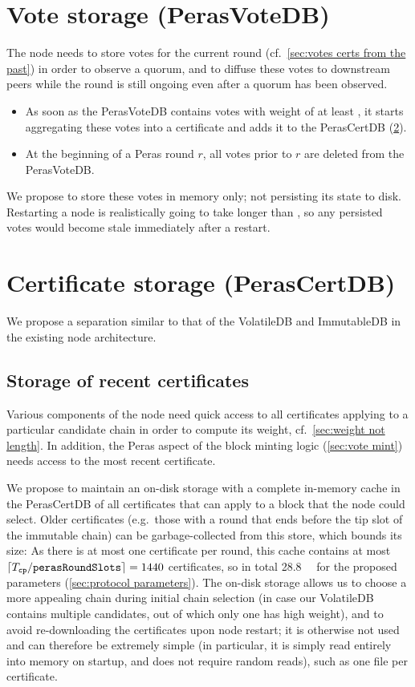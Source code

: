 \section{Vote storage (PerasVoteDB)}\label{sec:vote db}

The node needs to store votes for the current round (cf.~\cref{sec:votes certs from the past}) in order to observe a quorum, and to diffuse these votes to downstream peers while the round is still ongoing even after a quorum has been observed.

\begin{itemize}
\item
  As soon as the PerasVoteDB contains votes with weight of at least \perasQuorum, it starts aggregating these votes into a certificate and adds it to the PerasCertDB (\cref{sec:cert db}).
\item
  At the beginning of a Peras round $r$, all votes prior to $r$ are deleted from the PerasVoteDB\@.
\end{itemize}

We propose to store these votes in memory only; not persisting its state to disk.
Restarting a node is realistically going to take longer than \perasRoundSlots{}, so any persisted votes would become stale immediately after a restart.

\section{Certificate storage (PerasCertDB)}\label{sec:cert db}

We propose a separation similar to that of the VolatileDB and ImmutableDB in the existing node architecture.

\subsection{Storage of recent certificates}
Various components of the node need quick access to all certificates applying to a particular candidate chain in order to compute its weight, cf.~\cref{sec:weight not length}.
In addition, the Peras aspect of the block minting logic (\cref{sec:vote mint}) needs access to the most recent certificate.

We propose to maintain an on-disk storage with a complete in-memory cache in the PerasCertDB of all certificates that can apply to a block that the node could select.
Older certificates (e.g.\ those with a round that ends before the tip slot of the immutable chain) can be garbage-collected from this store, which bounds its size:
As there is at most one certificate per round, this cache contains at most $\lceil T_{\mathtt{cp}} / \mathtt{perasRoundSlots} \rceil = 1440$ certificates, so in total \qty{28.8}{\mega\byte} for the proposed parameters (\cref{sec:protocol parameters}).
The on-disk storage allows us to choose a more appealing chain during initial chain selection (in case our VolatileDB contains multiple candidates, out of which only one has high weight), and to avoid re-downloading the certificates upon node restart; it is otherwise not used and can therefore be extremely simple (in particular, it is simply read entirely into memory on startup, and does not require random reads), such as one file per certificate.

